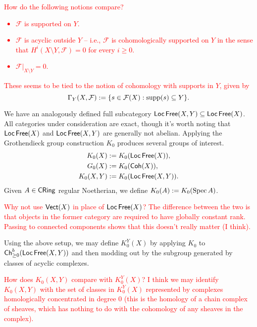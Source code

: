 \documentclass[11pt]{article}
\newcommand{\FF}{\mathcal{F}}
\begin{document}
\textcolor{red}{\begin{remark}
How do the following notions compare?
\begin{itemize}
\item $\FF$ is supported on $Y$.
\item $\FF$ is acyclic outside $Y$ -- i.e., $\FF$ is cohomologically supported on $Y$ in the sense that $H^i(X\setminus Y,\FF)=0$ for every $i\geq0$.
\item $\FF|_{X\setminus Y}=0$.
\end{itemize}
These seems to be tied to the notion of cohomology with supports in $Y$, given by 
$$\Gamma_Y(X,\FF):=\{s\in\FF(X) : \supp(s)\subset Y\}.$$
\end{remark}}

We have an analogously defined full subcategory $\operatorname{\mathsf{Loc}}\operatorname{\mathsf{Free}}(X,Y)\subseteq\operatorname{\mathsf{Loc}}\operatorname{\mathsf{Free}}(X)$. All categories under consideration are exact, though it's worth noting that $\operatorname{\mathsf{Loc}}\operatorname{\mathsf{Free}}(X)$ and $\operatorname{\mathsf{Loc}}\operatorname{\mathsf{Free}}(X,Y)$ are generally not abelian. Applying the Grothendieck group construction $K_0$ produces several groups of interest.
\begin{align*}
K_0(X)&:=K_0(\operatorname{\mathsf{Loc}}\operatorname{\mathsf{Free}}(X)), \\
G_0(X)&:=K_0(\operatorname{\mathsf{Coh}}(X)), \\
K_0(X,Y)&:=K_0(\operatorname{\mathsf{Loc}}\operatorname{\mathsf{Free}}(X,Y)). \\
\end{align*}
Given $A\in\operatorname{\mathsf{CRing}}$ regular Noetherian, we define $K_0(A):=K_0(\operatorname{Spec} A)$.

\textcolor{red}{\begin{remark}
Why not use $\operatorname{\mathsf{Vect}}(X)$ in place of $\operatorname{\mathsf{Loc}}\operatorname{\mathsf{Free}}(X)$? The difference between the two is that objects in the former category are required to have globally constant rank. Passing to connected components shows that this doesn't really matter (I think).
\end{remark}}

Using the above setup, we may define $K_0^Y(X)$ by applying $K_0$ to $\operatorname{\mathsf{Ch}}_{\geq0}^b(\operatorname{\mathsf{Loc}}\operatorname{\mathsf{Free}}(X,Y))$ and then modding out by the subgroup generated by classes of acyclic complexes.

\textcolor{red}{\begin{remark}
How does $K_0(X,Y)$ compare with $K_0^Y(X)$? I think we may identify $K_0(X,Y)$ with the set of classes in $K_0^Y(X)$ represented by complexes homologically concentrated in degree $0$ (this is the homology of a chain complex of sheaves, which has nothing to do with the cohomology of any sheaves in the complex).
\end{remark}}
\end{document}
